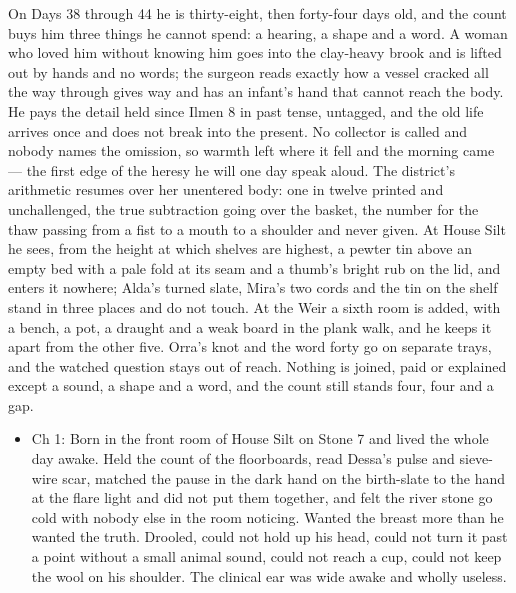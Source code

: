 \documentclass{design/chronicle}
\begin{document}
{On Days 38 through 44 he is thirty-eight, then forty-four days old, and the count buys him three things he cannot spend: a hearing, a shape and a word. A woman who loved him without knowing him goes into the clay-heavy brook and is lifted out by hands and no words; the surgeon reads exactly how a vessel cracked all the way through gives way and has an infant’s hand that cannot reach the body. He pays the detail held since Ilmen 8 in past tense, untagged, and the old life arrives once and does not break into the present. No collector is called and nobody names the omission, so warmth left where it fell and the morning came --- the first edge of the heresy he will one day speak aloud. The district’s arithmetic resumes over her unentered body: one in twelve printed and unchallenged, the true subtraction going over the basket, the number for the thaw passing from a fist to a mouth to a shoulder and never given. At House Silt he sees, from the height at which shelves are highest, a pewter tin above an empty bed with a pale fold at its seam and a thumb’s bright rub on the lid, and enters it nowhere; Alda’s turned slate, Mira’s two cords and the tin on the shelf stand in three places and do not touch. At the Weir a sixth room is added, with a bench, a pot, a draught and a weak board in the plank walk, and he keeps it apart from the other five. Orra’s knot and the word forty go on separate trays, and the watched question stays out of reach. Nothing is joined, paid or explained except a sound, a shape and a word, and the count still stands four, four and a gap.

\begin{itemize}[leftmargin=1.4em,itemsep=1pt,topsep=3pt,parsep=0pt]

\item Ch 1: Born in the front room of House Silt on Stone 7 and lived the whole day awake. Held the count of the floorboards, read Dessa’s pulse and sieve-wire scar, matched the pause in the dark hand on the birth-slate to the hand at the flare light and did not put them together, and felt the river stone go cold with nobody else in the room noticing. Wanted the breast more than he wanted the truth. Drooled, could not hold up his head, could not turn it past a point without a small animal sound, could not reach a cup, could not keep the wool on his shoulder. The clinical ear was wide awake and wholly useless.


\end{itemize}}
\end{document}
